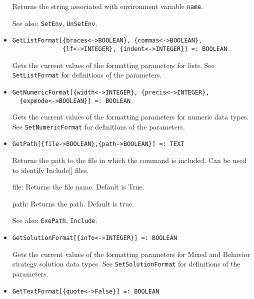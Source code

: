 \begin{itemize}
\bd
Returns the string associated with environment variable \verb+name+.
\item [See also:] \verb+SetEnv+, \verb+UnSetEnv+.
\ed


\item{}
\protect \large \begin{verbatim}
GetListFormat[{braces<->BOOLEAN}, {commas<->BOOLEAN},
              {lf<->INTEGER}, {indent<->INTEGER}] =: BOOLEAN
\end{verbatim} \normalsize

\bd
Gets the current values of the formatting parameters for lists.  See
\verb+SetListFormat+ for definitions of the parameters. 
\ed

\item{}
\protect \large \begin{verbatim}
GetNumericFormat[{width<->INTEGER}, {precis<->INTEGER}, 
  {expmode<->BOOLEAN}] =: BOOLEAN 
\end{verbatim} \normalsize

\bd 
Gets the current values of the formatting parameters for numeric
data types.  See \verb+SetNumericFormat+ for definitions of the
parameters.  
\ed

\item{}
\protect \large \begin{verbatim}
GetPath[{file->BOOLEAN},{path->BOOLEAN}] =: TEXT 
\end{verbatim} \normalsize

\bd
Returns the path to the file in which the command is included.  Can be
used to identify Include[] files. 
\bd
\item [file:] Returns the file name.  Default is True.  
\item [path:] Returns the path.  Default is true. 
\ed
\item [See also:] \verb+ExePath+, \verb+Include+.
\ed

\item{}
\protect \large \begin{verbatim}
GetSolutionFormat[{info<->INTEGER}] =: BOOLEAN 
\end{verbatim} \normalsize

\bd
Gets the current values of the formatting parameters for Mixed and
Behavior strategy solution data types.  See \verb+SetSolutionFormat+ for
definitions of the parameters.  
\ed

\item{}
\protect \large \begin{verbatim}
GetTextFormat[{quote<->False}] =: BOOLEAN 
\end{verbatim} \normalsize


\end{itemize}
